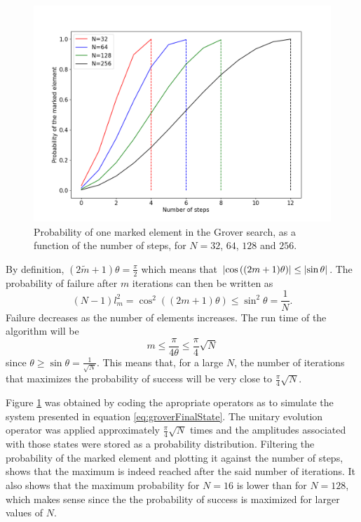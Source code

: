 \documentclass[../../dissertation.tex]{subfiles}
\begin{document}
\begin{figure}[!h]
	\centering
	\includegraphics[scale=0.40]{img/Grover/GroverOneMarked3264128256}
	\caption{Probability of one marked element in the Grover search, as a function of the number of steps, for $N=32$, $64$, $128$ and $256$.} 
	\label{fig:groverOneMarked163264128}
\end{figure}
By definition, $(2\widetilde{m}+1)\theta = \frac{\pi}{2}$ which means that
$\abs{\cos{((2m+1)}\theta)} \leq \abs{\sin{\theta}}$. The probability of
failure after $m$ iterations can then be written as
\begin{equation}
	(N-1)l_m^2 = \cos^2{((2m+1)\theta)} \leq \sin^2\theta = \frac{1}{N}.
\end{equation}
Failure decreases as the number of elements increases. The run time of the algorithm will be
\begin{equation}
	m \leq \frac{\pi}{4\theta} \leq \frac{\pi}{4}\sqrt{N}
\end{equation}
since $\theta \geq \sin\theta = \frac{1}{\sqrt{N}}$. This means that, for a
large $N$, the number of iterations that maximizes the probability of success
will be very close to $\frac{\pi}{4}\sqrt{N}$.\par 
Figure \ref{fig:groverOneMarked163264128} was obtained by coding the apropriate
operators as to simulate the system presented in equation
\ref{eq:groverFinalState}. 
The unitary evolution operator was applied approximately
$\frac{\pi}{4}\sqrt{N}$ times and the amplitudes associated with those states
were stored as a probability distribution. Filtering the probability of the
marked element and plotting it against the number of steps, shows that the
maximum is indeed reached after the said number of iterations. It also shows
that the maximum probability for $N=16$ is lower than for $N=128$, which makes
sense since the the probability of success is maximized for larger values of
$N$.
\end{document}
